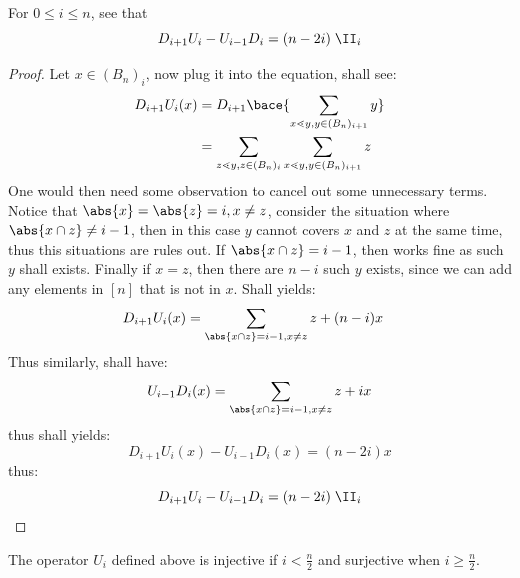 \begin{lemma}
	For \( 0 \leq i \leq n \), see that
	\[
		D_{i+1} U_i - U_{i-1} D_{i} = (n-2i)\; \II_i
	\]
\end{lemma}

\begin{proof}
	Let \( x \in (B_n)_{i} \), now plug it into the equation, shall see:
	\[
		\begin{aligned}
			D_{i+1}U_i (x) & = D_{i+1} \bace{\sum_{x\lessdot y, y\in (B_n)_{i+1}} y}                     \\
			               & = \sum_{z \lessdot y, z \in (B_n)_i} \sum_{x\lessdot y, y\in (B_n)_{i+1}} z
		\end{aligned}
	\]
	One would then need some observation to cancel out some unnecessary terms. Notice that
	\( \abs{x} = \abs{z} = i, x\ne z \), consider the situation where \( \abs{x\cap z} \ne i-1 \),
	then in this case \( y \) cannot covers \( x \) and \( z \) at the same time, thus this situations
	are rules out. If \( \abs{x \cap z} =i - 1 \), then works fine as such \( y \) shall exists.
	Finally if \( x = z \), then there are \( n-i \) such \( y \) exists, since we can add any
	elements in \( [n] \) that is not in \( x \). Shall yields:
	\[
		\begin{aligned}
			D_{i+1} U_i (x) & = \sum_{\abs{x\cap z} = i - 1, x\ne z} z + (n-i)x
		\end{aligned}
	\]
	Thus similarly, shall have:
	\[
		U_{i-1} D_i (x) = \sum_{\abs{x\cap z} = i - 1, x\ne z} z + i x
	\]
	thus shall yields:
	\[
		D_{i+1} U_i (x) - U_{i-1} D_i (x) = (n-2i)x
	\]
	thus:
	\[
		D_{i+1} U_i - U_{i-1} D_i = (n-2i)\; \II_i
	\]
\end{proof}

\begin{theorem}
	The operator \( U_i \) defined above is injective if \( i < \frac{n}{2} \) and surjective when \(
	i \geq \frac{n}{2}\).
\end{theorem}

